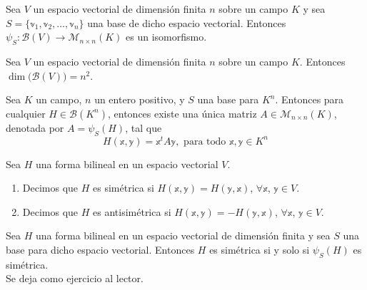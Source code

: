 \begin{theorem}
    Sea $V$ un espacio vectorial de dimensión finita $n$ sobre un campo $K$ y sea $S = \{ \mathbb{v}_1, \mathbb{v}_2, \dots, \mathbb{v}_n \}$ una base de dicho espacio vectorial. Entonces $\psi_S: \mathcal{B}(V) \longrightarrow \mathcal{M}_{n \times n}(K)$ es un isomorfismo.
\end{theorem}

\begin{corollary}
    Sea $V$ un espacio vectorial de dimensión finita $n$ sobre un campo $K$. Entonces $\dim \big( \mathcal{B}(V) \big) = n^2$.
\end{corollary}

\begin{corollary}
    Sea $K$ un campo, $n$ un entero positivo, y $S$ una base para $K^n$. Entonces para cualquier $H \in \mathcal{B}(K^n)$, entonces existe una única matriz $A \in \mathcal{M}_{n \times n}(K)$, denotada por $A = \psi_S(H)$, tal que
    $$H(\mathbb{x}, \mathbb{y}) = \mathbb{x}^t A \mathbb{y}, \text{ para todo } \mathbb{x}, \mathbb{y} \in K^n$$
\end{corollary}

\newpage

\begin{definition}
    Sea $H$ una forma bilineal en un espacio vectorial $V$.
    \begin{enumerate}[label=\roman*)]
        \item Decimos que $H$ es simétrica si $H(\mathbb{x}, \mathbb{y}) = H(\mathbb{y}, \mathbb{x})$, $\forall \mathbb{x}$, $\mathbb{y} \in V$.
        \item Decimos que $H$ es antisimétrica si $H(\mathbb{x}, \mathbb{y}) = - H(\mathbb{y}, \mathbb{x})$, $\forall \mathbb{x}$, $\mathbb{y} \in V$.
    \end{enumerate}
\end{definition}

\begin{theorem}
    Sea $H$ una forma bilineal en un espacio vectorial de dimensión finita y sea $S$ una base para dicho espacio vectorial. Entonces $H$ es simétrica si y solo si $\psi_S(H)$ es simétrica. \\
    \demostracion Se deja como ejercicio al lector.
\end{theorem}


